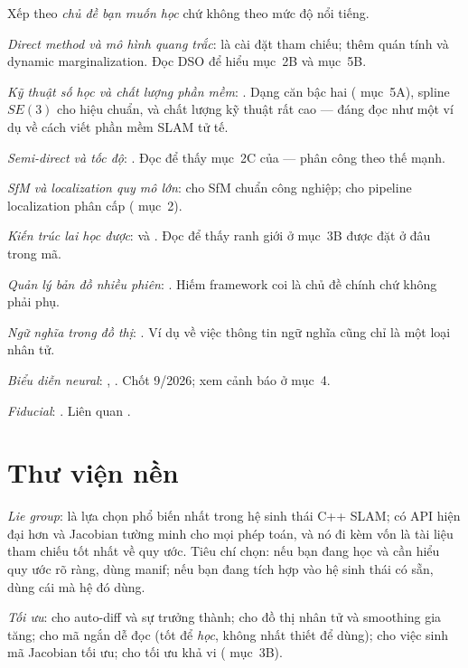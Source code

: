 \documentclass[../../vslam.tex]{subfiles}
\begin{document}
Xếp theo \emph{chủ đề bạn muốn học} chứ không theo mức độ nổi tiếng.

\emph{Direct method và mô hình quang trắc}:  là cài đặt tham chiếu;  thêm quán tính và dynamic marginalization. Đọc DSO để hiểu  mục~2B và  mục~5B.

\emph{Kỹ thuật số học và chất lượng phần mềm}: . Dạng căn bậc hai ( mục~5A), spline \(SE(3)\) cho hiệu chuẩn, và chất lượng kỹ thuật rất cao --- đáng đọc như một ví dụ về cách viết phần mềm SLAM tử tế.

\emph{Semi-direct và tốc độ}: . Đọc để thấy mục~2C của  --- phân công theo thế mạnh.

\emph{SfM và localization quy mô lớn}:  cho SfM chuẩn công nghiệp;  cho pipeline localization phân cấp ( mục~2).

\emph{Kiến trúc lai học được}:  và . Đọc để thấy ranh giới ở  mục~3B được đặt ở đâu trong mã.

\emph{Quản lý bản đồ nhiều phiên}: . Hiếm framework coi  là chủ đề chính chứ không phải phụ.

\emph{Ngữ nghĩa trong đồ thị}: . Ví dụ về việc thông tin ngữ nghĩa cũng chỉ là một loại nhân tử.

\emph{Biểu diễn neural}: , . Chốt 9/2026; xem cảnh báo ở  mục~4.

\emph{Fiducial}: . Liên quan .

\section{Thư viện nền}

\emph{Lie group}:  là lựa chọn phổ biến nhất trong hệ sinh thái C++ SLAM;  có API hiện đại hơn và Jacobian tường minh cho mọi phép toán, và nó đi kèm \cite{sola2018microlie} vốn là tài liệu tham chiếu tốt nhất về quy ước. Tiêu chí chọn: nếu bạn đang học và cần hiểu quy ước rõ ràng, dùng manif; nếu bạn đang tích hợp vào hệ sinh thái có sẵn, dùng cái mà hệ đó dùng.

\emph{Tối ưu}:  cho auto-diff và sự trưởng thành;  cho đồ thị nhân tử và smoothing gia tăng;  cho mã ngắn dễ đọc (tốt để \emph{học}, không nhất thiết để dùng);  cho việc sinh mã Jacobian tối ưu;  cho tối ưu khả vi ( mục~3B).
\end{document}
